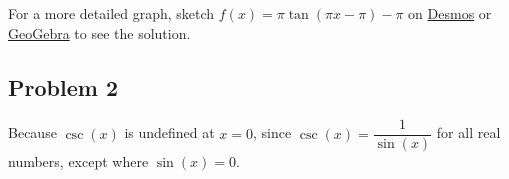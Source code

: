 \documentclass[12pt]{article}
\begin{document}
For a more detailed graph, sketch \(f(x)=\pi \tan(\pi x - \pi)-\pi\) on \href{https://www.desmos.com/calculator}{Desmos} or \href{https://www.geogebra.org/graphing?lang=en}{GeoGebra} to see the solution.

\subsection*{Problem 2}
Because \(\csc(x)\) is undefined at \(x=0\), since \(\csc(x)=\dfrac{1}{\sin(x)}\) for all real numbers, except where \(\sin(x)=0\).
\end{document}
